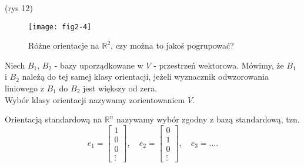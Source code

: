 \documentclass[../main.tex]{subfiles}
\begin{document}
(rys 12)
\begin{figure}[h]
    \centering
    \texttt{[image: fig2-4]}
    \caption{Różne orientacje na $\mathbb{R}^2$, czy można to jakoś pogrupować?}
    \label{fig:fig2-4}
\end{figure}
\begin{definicja}
    Niech $B_1$, $B_2$ - bazy uporządkowane w $V$ - przestrzeń wektorowa. Mówimy, że $B_1$ i $B_2$ należą do tej samej klasy orientacji, jeżeli wyznacznik odwzorowania liniowego z $B_1$ do $B_2$ jest większy od zera.\\
    Wybór klasy orientacji nazywamy zorientowaniem $V$.
\end{definicja}
\begin{definicja}
    Orientacją standardową na $\mathbb{R}^n$ nazywamy wybór zgodny z bazą standardową, tzn.
    \[
        e_1 = \begin{bmatrix} 1\\0\\0\\ \vdots \end{bmatrix},\quad e_2 = \begin{bmatrix} 0\\1\\0\\ \vdots \end{bmatrix},\quad e_3 = \ldots
    .\]
\end{definicja}
\end{document}

